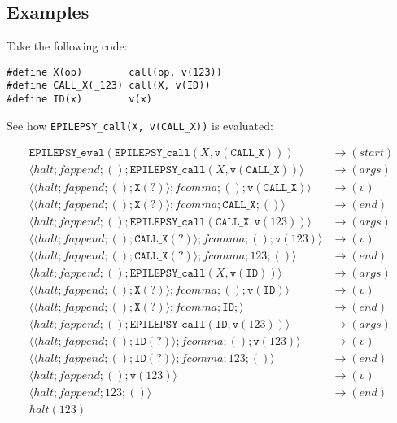 \documentclass[12pt]{article}
\theoremstyle{break}
\begin{document}
\subsection{Examples}

Take the following code:

\begin{verbatim}
#define X(op)        call(op, v(123))
#define CALL_X(_123) call(X, v(ID))
#define ID(x)        v(x)
\end{verbatim}

See how \texttt{EPILEPSY\_call(X, v(CALL\_X))} is evaluated:

\begin{example}
\begin{align*}
    \texttt{EPILEPSY\_eval}(\texttt{EPILEPSY\_call}(X, \texttt{v}(\texttt{CALL\_X}))) & \to (start) \\
    \langle halt; fappend; (); \texttt{EPILEPSY\_call}(X, \texttt{v}(\texttt{CALL\_X})) \rangle & \to (args) \\
    \langle \langle halt; fappend; (); \texttt{X}(?) \rangle; fcomma; (); \texttt{v}(\texttt{CALL\_X}) \rangle & \to (v) \\
    \langle \langle halt; fappend; (); \texttt{X}(?) \rangle; fcomma; \texttt{CALL\_X}; () \rangle & \to (end) \\
    \langle halt; fappend; (); \texttt{EPILEPSY\_call}(\texttt{CALL\_X}, \texttt{v}(123)) \rangle & \to (args) \\
    \langle \langle halt; fappend; (); \texttt{CALL\_X}(?) \rangle; fcomma; (); \texttt{v}(123) \rangle & \to (v) \\
    \langle \langle halt; fappend; (); \texttt{CALL\_X}(?) \rangle; fcomma; 123; () \rangle & \to (end) \\
    \langle halt; fappend; (); \texttt{EPILEPSY\_call}(X, \texttt{v}(\texttt{ID})) \rangle & \to (args) \\
    \langle \langle halt; fappend; (); \texttt{X}(?) \rangle; fcomma; (); \texttt{v}(\texttt{ID}) \rangle & \to (v) \\
    \langle \langle halt; fappend; (); \texttt{X}(?) \rangle; fcomma; \texttt{ID}; \rangle & \to (end) \\
    \langle halt; fappend; (); \texttt{EPILEPSY\_call}(\texttt{ID}, \texttt{v}(123)) \rangle & \to (args) \\
    \langle \langle halt; fappend; (); \texttt{ID}(?) \rangle; fcomma; (); \texttt{v}(123) \rangle & \to (v) \\
    \langle \langle halt; fappend; (); \texttt{ID}(?) \rangle; fcomma; 123; () \rangle & \to (end) \\
    \langle halt; fappend; (); \texttt{v}(123) \rangle & \to (v) \\
    \langle halt; fappend; 123; () \rangle & \to (end) \\
    halt(123) &
\end{align*}
\end{example}
\end{document}
